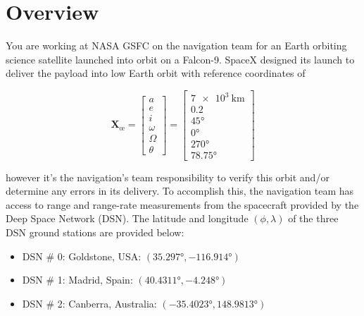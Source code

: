 


%
%

\hwkCompletionDate{\today}



\maketitle

\pagebreak

\section*{Overview} \label{hwk:overview}

You are working at NASA GSFC on the navigation team for an Earth orbiting science satellite launched into orbit on a Falcon-9. SpaceX designed its launch to deliver the payload into low Earth orbit with reference coordinates of

\[
	\bm{X}_{\text{\oe}}=\left[\begin{array}{c}
			a \\
			e \\
			i \\
			\omega \\
			\Omega \\
			\theta
			\end{array}\right]=\left[\begin{array}{cc}
			\qty{7e3}{\km} \\
			0.2 \\
			\ang{45} \\
			\ang{0} \\
			\ang{270} \\
			\ang{78.75}
	\end{array}\right]
\]

however it's the navigation's team responsibility to verify this orbit and/or determine any errors in its delivery. To accomplish this, the navigation team has access to range and range-rate measurements from the spacecraft provided by the Deep Space Network (DSN). The latitude and longitude \( \left( \phi, \lambda \right) \) of the three DSN ground stations are provided below:
\begin{itemize}
	\item DSN \# 0: Goldstone, USA: \( \left( \ang{35.297}, \ang{-116.914} \right) \)
	\item DSN \# 1: Madrid, Spain: \( \left( \ang{40.4311}, \ang{-4.248} \right) \)
	\item DSN \# 2: Canberra, Australia: \( \left( \ang{-35.4023}, \ang{148.9813} \right) \)
\end{itemize}

